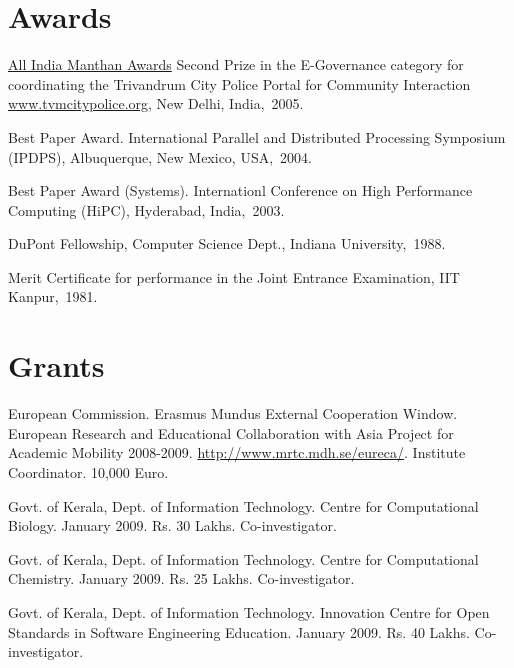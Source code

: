 \documentclass[11pt,margin,line]{res}
\begin{document}
\begin{resume}
\section{\sc Awards}

\href{http://www.manthanaward.com/winner2005.asp}{All India
Manthan Awards} Second Prize in the E-Governance category
for coordinating the Trivandrum City Police Portal for
Community Interaction \url{www.tvmcitypolice.org}, New
Delhi, India,~2005.


Best Paper Award. International Parallel and Distributed
Processing Symposium (IPDPS), Albuquerque, New Mexico,
USA,~2004.


Best Paper Award  (Systems). Internationl Conference on High
Performance Computing (HiPC), Hyderabad, India,~2003.

DuPont Fellowship, Computer Science Dept., Indiana
University,~1988.

Merit Certificate for performance in the Joint Entrance
Examination, IIT Kanpur,~1981.


\section{\sc Grants}

European Commission.  Erasmus Mundus External Cooperation
Window. European Research and Educational Collaboration with
Asia Project for Academic Mobility 2008-2009.
\url{http://www.mrtc.mdh.se/eureca/}.  Institute
Coordinator.  10,000 Euro.

Govt. of Kerala, Dept. of Information Technology.  Centre
for Computational Biology.  January 2009.  Rs. 30 Lakhs.
Co-investigator.

Govt. of Kerala, Dept. of Information Technology.  Centre
for Computational Chemistry.  January 2009.  Rs. 25 Lakhs.
Co-investigator.

Govt. of Kerala, Dept. of Information Technology.
Innovation Centre for Open Standards in Software Engineering
Education.  January 2009.  Rs. 40 Lakhs.  Co-investigator.



\end{resume}
\end{document}
